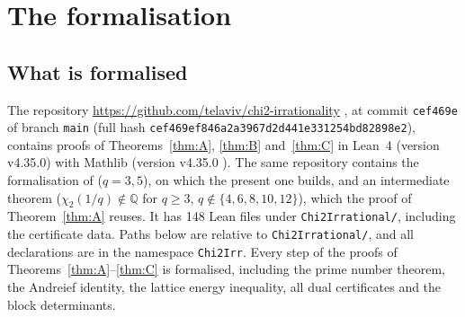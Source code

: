 \documentclass[11pt]{amsart}
\theoremstyle{definition}
\theoremstyle{remark}
\numberwithin{equation}{section}
\newcommand{\QQ}{\mathbb{Q}}
\newcommand{\lean}[1]{{\def\_{\textunderscore\allowbreak}\texttt{#1}}}
\begin{document}
\section{The formalisation}\label{sec:lean}

\subsection{What is formalised}
The repository \url{https://github.com/telaviv/chi2-irrationality} \cite{Chi2Repo}, at commit \lean{cef469e} of branch
\lean{main} (full hash \lean{cef469ef846a2a3967d2d441e331254bd82898e2}), contains proofs of Theorems~\ref{thm:A},
\ref{thm:B} and~\ref{thm:C} in Lean~4 \cite{LeanFour} (version v4.35.0) with Mathlib \cite{Mathlib} (version v4.35.0
\cite{Mathlib4}). The same repository contains the formalisation of \cite{Chi2Paper} ($q=3,5$), on which the present
one builds, and an intermediate theorem ($\chi_2(1/q)\notin\QQ$ for $q\ge3$, $q\notin\{4,6,8,10,12\}$), which the proof of
Theorem~\ref{thm:A} reuses. It has 148 Lean files under \lean{Chi2Irrational\slash{}}, including the certificate data.
Paths below are relative to \lean{Chi2Irrational\slash{}}, and all declarations are in the namespace \lean{Chi2Irr}.
Every step of the proofs of Theorems~\ref{thm:A}--\ref{thm:C} is formalised, including the prime number theorem, the Andreief identity, the lattice
energy inequality, all dual certificates and the block determinants.
\end{document}
